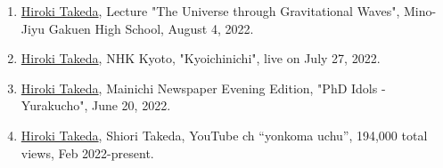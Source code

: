 \documentclass[uplatex, 12pt]{article}
\begin{document}
\begin{enumerate}
\item \uline{Hiroki Takeda}, Lecture "The Universe through Gravitational Waves", Mino-Jiyu Gakuen High School, August 4, 2022.

\item \uline{Hiroki Takeda}, NHK Kyoto, "Kyoichinichi", live on July 27, 2022.\\

\item \uline{Hiroki Takeda}, Mainichi Newspaper Evening Edition, "PhD Idols - Yurakucho", June 20, 2022.\\

\item \uline{Hiroki Takeda}, Shiori Takeda, YouTube ch “yonkoma uchu”,  194,000 total views, Feb 2022-present.\\

\end{enumerate}
\end{document}
